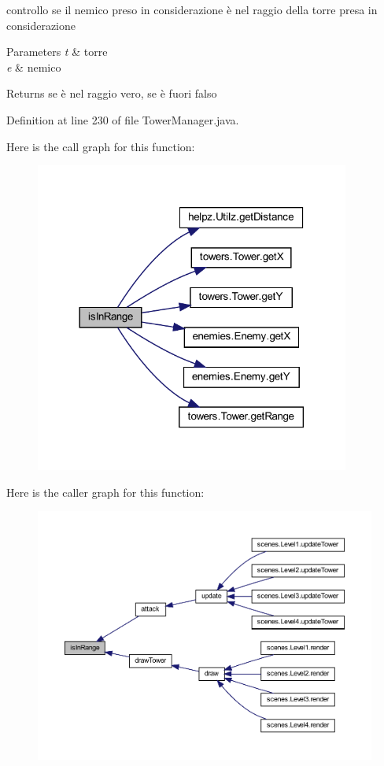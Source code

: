 controllo se il nemico preso in considerazione è nel raggio della torre presa in considerazione 


\begin{DoxyParams}{Parameters}
{\em t} & torre \\
\hline
{\em e} & nemico\\
\hline
\end{DoxyParams}
\begin{DoxyReturn}{Returns}
se è nel raggio vero, se è fuori falso 
\end{DoxyReturn}


Definition at line 230 of file Tower\+Manager.\+java.

Here is the call graph for this function\+:\nopagebreak
\begin{figure}[H]
\begin{center}
\leavevmode
\includegraphics[width=293pt]{classmanagers_1_1_tower_manager_a5f1dea7776d18a6f69428e43c4845fdb_cgraph}
\end{center}
\end{figure}
Here is the caller graph for this function\+:\nopagebreak
\begin{figure}[H]
\begin{center}
\leavevmode
\includegraphics[width=350pt]{classmanagers_1_1_tower_manager_a5f1dea7776d18a6f69428e43c4845fdb_icgraph}
\end{center}
\end{figure}
